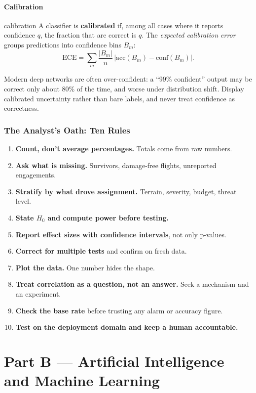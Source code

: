 \documentclass[11pt]{article}
\begin{document}
\subsection{Calibration}
\begin{definition}{calibration}
A classifier is \textbf{calibrated} if, among all cases where it reports confidence $q$, the fraction that are correct is $q$. The \emph{expected calibration error} groups predictions into confidence bins $B_m$:
\[\text{ECE}=\sum_m\frac{|B_m|}{n}\,\big|\text{acc}(B_m)-\text{conf}(B_m)\big|.\]
\end{definition}
Modern deep networks are often over-confident: a ``99\% confident'' output may be correct only about 80\% of the time, and worse under distribution shift. Display calibrated uncertainty rather than bare labels, and never treat confidence as correctness.

\section{The Analyst's Oath: Ten Rules}
\begin{enumerate}
\item \textbf{Count, don't average percentages.} Totals come from raw numbers.
\item \textbf{Ask what is missing.} Survivors, damage-free flights, unreported engagements.
\item \textbf{Stratify by what drove assignment.} Terrain, severity, budget, threat level.
\item \textbf{State $H_0$ and compute power before testing.}
\item \textbf{Report effect sizes with confidence intervals}, not only p-values.
\item \textbf{Correct for multiple tests} and confirm on fresh data.
\item \textbf{Plot the data.} One number hides the shape.
\item \textbf{Treat correlation as a question, not an answer.} Seek a mechanism and an experiment.
\item \textbf{Check the base rate} before trusting any alarm or accuracy figure.
\item \textbf{Test on the deployment domain and keep a human accountable.}
\end{enumerate}

\part*{Part B --- Artificial Intelligence and Machine Learning}
\end{document}

